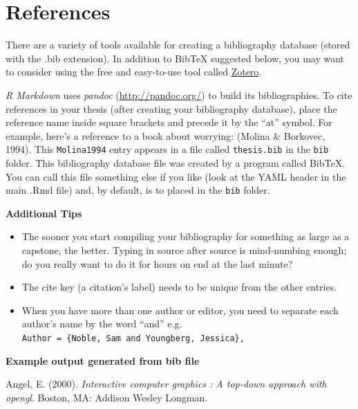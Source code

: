 \documentclass[12pt,oneside]{chicagocapstone}
\providecommand{\tightlist}{%
  \setlength{\itemsep}{0pt}\setlength{\parskip}{0pt}}
\begin{document}
\backmatter

\hypertarget{references}{%
\chapter*{References}\label{references}}


\noindent

\setlength{\parindent}{-0.20in}
\setlength{\leftskip}{0.20in}
\setlength{\parskip}{8pt}

There are a variety of tools available for creating a bibliography database (stored with the .bib extension). In addition to BibTeX suggested below, you may want to consider using the free and easy-to-use tool called \href{https://www.zotero.org/}{Zotero}.

\emph{R Markdown} uses \emph{pandoc} (\url{http://pandoc.org/}) to build its bibliographies. To cite references in your thesis (after creating your bibliography database), place the reference name inside square brackets and precede it by the ``at'' symbol. For example, here's a reference to a book about worrying: (Molina \& Borkovec, 1994). This \texttt{Molina1994} entry appears in a file called \texttt{thesis.bib} in the \texttt{bib} folder. This bibliography database file was created by a program called BibTeX. You can call this file something else if you like (look at the YAML header in the main .Rmd file) and, by default, is to placed in the \texttt{bib} folder.

\textbf{Additional Tips}
\begin{itemize}
\tightlist
\item
  The sooner you start compiling your bibliography for something as large as a capstone, the better. Typing in source after source is mind-numbing enough; do you really want to do it for hours on end at the last minute?
\item
  The cite key (a citation's label) needs to be unique from the other entries.
\item
  When you have more than one author or editor, you need to separate each author's name by the word ``and'' e.g. \texttt{Author\ =\ \{Noble,\ Sam\ and\ Youngberg,\ Jessica\},}
\end{itemize}
\textbf{Example output generated from bib file}

\hypertarget{refs}{}
\leavevmode\hypertarget{ref-angel2000}{}%
Angel, E. (2000). \emph{Interactive computer graphics : A top-down approach with opengl}. Boston, MA: Addison Wesley Longman.
\end{document}
